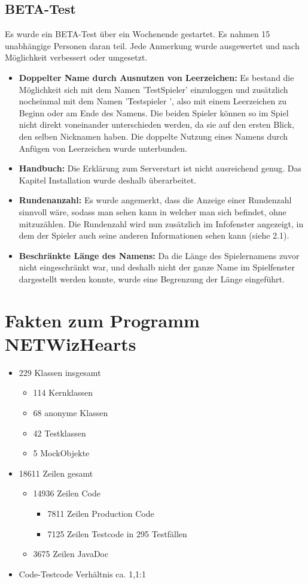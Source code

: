 \documentclass[a4paper]{article}
\begin{document}
	\subsection{BETA-Test}
	Es wurde ein BETA-Test über ein Wochenende gestartet. Es nahmen 15 unabhängige Personen daran teil.
	Jede Anmerkung wurde ausgewertet und nach Möglichkeit verbessert oder umgesetzt.
	\begin{itemize}
	\item \textbf{Doppelter Name durch Ausnutzen von Leerzeichen:} Es bestand die Möglichkeit sich mit dem Namen 'TestSpieler' einzuloggen und zusätzlich nocheinmal mit dem Namen 'Testspieler ', also mit einem Leerzeichen zu Beginn oder am Ende des Namens. Die beiden Spieler können so im Spiel nicht direkt voneinander unterschieden werden, da sie auf den ersten Blick, den selben Nicknamen haben. Die doppelte Nutzung eines Namens durch Anfügen von Leerzeichen wurde unterbunden.
	\item \textbf{Handbuch:} Die Erklärung zum Serverstart ist nicht ausreichend genug. Das Kapitel Installation wurde deshalb 			überarbeitet.
	\item \textbf{Rundenanzahl:} Es wurde angemerkt, dass die Anzeige einer Rundenzahl sinnvoll wäre, sodass man sehen kann in 			welcher man sich befindet, ohne mitzuzählen. Die Rundenzahl wird nun zusätzlich im Infofenster angezeigt, in dem der			Spieler auch seine anderen Informationen sehen kann (siehe 2.1).
	\item \textbf{Beschränkte Länge des Namens:} Da die Länge des Spielernamens zuvor nicht eingeschränkt war, und deshalb nicht 		der ganze Name im Spielfenster dargestellt werden konnte, wurde eine Begrenzung der Länge eingeführt.
	\end{itemize}
	
\section{Fakten zum Programm NETWizHearts}
	\begin{itemize}
\item 229 Klassen insgesamt
\begin{itemize}
\item 114 Kernklassen
\item 68 anonyme Klassen
\item 42 Testklassen
\item 5 MockObjekte
\end{itemize}
\item 18611 Zeilen gesamt
\begin{itemize}
\item 14936 Zeilen Code
\begin{itemize}
\item 7811 Zeilen Production Code
\item 7125 Zeilen Testcode in 295 Testfällen
\end{itemize}
\item 3675 Zeilen JavaDoc
\end{itemize}

\item Code-Testcode Verhältnis ca. 1,1:1 
\end{itemize}
\end{document}
